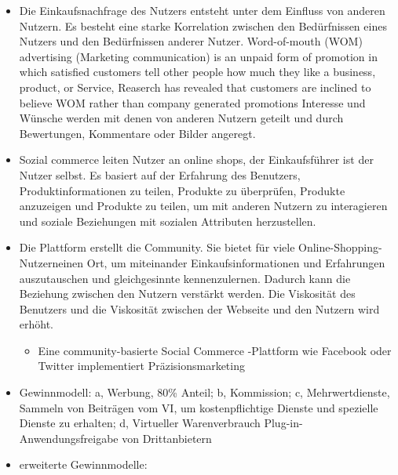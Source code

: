 \begin{itemize}
\item Die Einkaufsnachfrage des Nutzers entsteht unter dem Einfluss von anderen Nutzern. Es besteht eine starke Korrelation zwischen den Bedürfnissen eines Nutzers und den Bedürfnissen anderer Nutzer. Word-of-mouth (WOM) advertising (Marketing communication) is \glqq{}an unpaid form of promotion in which satisfied customers tell other people how much they like a business, product, or Service\grqq{}, \glqq{}Reaserch has revealed that customers are inclined to believe WOM rather than company generated promotions\grqq{} \parencite[S. 58]{turban:sc} Interesse und Wünsche werden mit denen von anderen Nutzern geteilt und durch Bewertungen, Kommentare oder Bilder angeregt.
\item Sozial commerce leiten Nutzer an online shops,  der Einkaufsführer ist der Nutzer selbst. Es basiert auf der Erfahrung des Benutzers, Produktinformationen zu teilen, Produkte zu überprüfen, Produkte anzuzeigen und Produkte zu teilen, um mit anderen Nutzern zu interagieren und soziale Beziehungen mit sozialen Attributen herzustellen.
\item Die Plattform erstellt die Community. Sie bietet für viele Online-Shopping-Nutzerneinen Ort, um miteinander Einkaufsinformationen und Erfahrungen auszutauschen und gleichgesinnte kennenzulernen. Dadurch kann die Beziehung zwischen den Nutzern verstärkt werden. Die Viskosität des Benutzers und die Viskosität zwischen der Webseite und den Nutzern wird erhöht.

\begin{itemize}
\item Eine community-basierte Social Commerce -Plattform wie Facebook oder Twitter implementiert Präzisionsmarketing
\end{itemize}

\item Gewinnmodell: a, Werbung, 80\% Anteil; b, Kommission; c,  Mehrwertdienste, Sammeln von Beiträgen vom VI, um kostenpflichtige Dienste und spezielle Dienste zu erhalten; d,  Virtueller Warenverbrauch Plug-in-Anwendungsfreigabe von Drittanbietern
\item erweiterte Gewinnmodelle:


\end{itemize}
